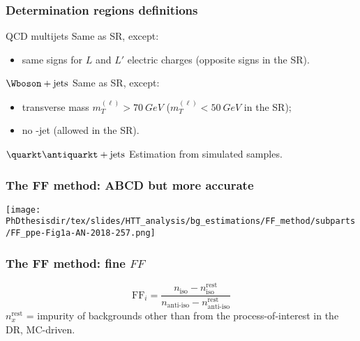 \begin{frame}
\frametitle{Determination regions definitions}

\begin{block}{QCD multijets}
Same as SR, except:
\begin{itemize}
\item same signs for $L$ and $L'$ electric charges (opposite signs in the SR).
\end{itemize}
\end{block}

\pause\vfill

\begin{block}{$\Wboson+\text{jets}$}
Same as SR, except:
\begin{itemize}
\item transverse mass $m_T^{(\ell)}>\SI{70}{GeV}$ ($m_T^{(\ell)}<\SI{50}{GeV}$ in the SR);
\item no \quarkb-jet (allowed in the SR).
\end{itemize}
\end{block}

\pause\vfill

\begin{block}{$\quarkt\antiquarkt+\text{jets}$}
Estimation from simulated samples.
\end{block}

\end{frame}

\begin{frame}
\frametitle{The FF method: ABCD but more accurate}
\begin{center}
\texttt{[image: \\PhDthesisdir/tex/slides/HTT\_analysis/bg\_estimations/FF\_method/subparts/FF\_ppe-Fig1a-AN-2018-257.png]}
\end{center}
\end{frame}

\begin{frame}
\frametitle{The FF method: fine $\mathit{FF}$}

\begin{equation*}
\mathrm{FF}_i = \frac{n_\text{iso} - n_\text{iso}^\text{rest}}{n_\text{anti-iso} - n_\text{anti-iso}^\text{rest}}
\end{equation*}
{\small $n_x^\text{rest}$ = impurity of backgrounds other than from the process-of-interest in the DR, MC-driven.}
\end{frame}